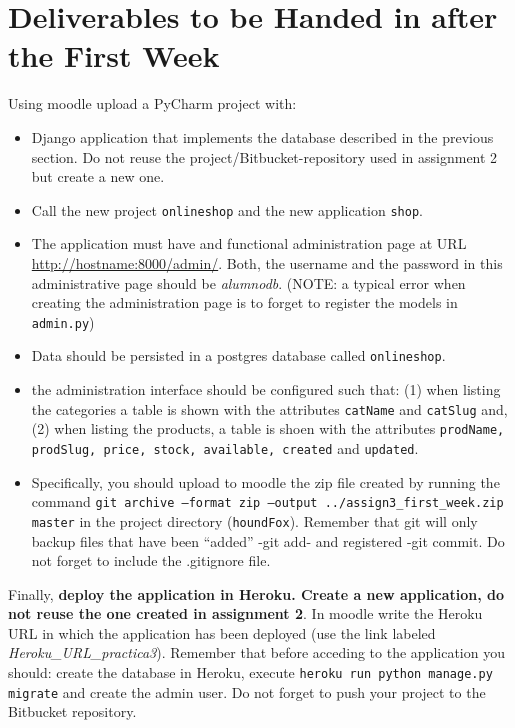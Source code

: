 \documentclass[12pt]{article} %
\newcounter{ejercicioNo}
\newcommand{\ttt}[1]{\texttt{#1}}%
\newcommand{\admin}{\texttt{admin.py}}%
\begin{document}
\section{Deliverables to be Handed in after the First Week}

\begin{minipage}{\linewidth}
\begin{framed}

Using moodle upload a PyCharm project with:

\begin{itemize}
 \item Django application that implements the database described in the previous section. Do not reuse the project/Bitbucket-repository used in assignment 2 but create a new one.
 \item Call the new project \texttt{onlineshop} and the new application \texttt{shop}.
 \item The application must have and functional administration page at URL \url{http://hostname:8000/admin/}. Both, the username and the password in this administrative page should be \textit{alumnodb}. (NOTE: a typical error when creating the administration page is 
 to forget to  register the models in  \admin)
 \item Data should be persisted in a postgres database called \texttt{onlineshop}.

  \item the administration interface should be configured such that: (1) when listing the categories a table is shown with the attributes \texttt{catName} and \texttt{catSlug} and, (2) when listing the products, a table is shoen with the attributes \texttt{prodName, prodSlug, price, stock, available, created} and \ttt{updated}.

\item Specifically, you should upload to moodle the  zip file created by running the command \texttt{git archive --format zip --output ../assign3\_first\_week.zip  master} in the project directory (\texttt{houndFox}). Remember that git will only backup files
that have been ``added'' -git add- and registered -git commit. Do not forget to include the .gitignore file. 

 \end{itemize}

Finally, \textbf{deploy the application in Heroku. Create a new application, do not reuse the one created in assignment 2}. In moodle write the Heroku URL in which the application has been deployed (use the link labeled \textit{Heroku\_URL\_practica3}). Remember that before acceding to the application you should: create the database in Heroku, execute \texttt{heroku run python manage.py migrate} and create the admin user. Do not forget to push your project to the Bitbucket repository.


\end{framed}
\end{minipage}
\end{document}
